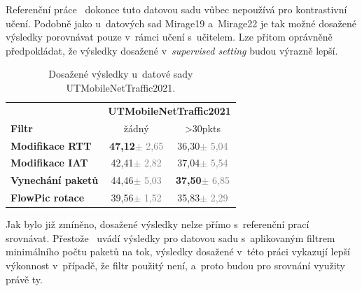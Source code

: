 Referenční práce~\cite{huawei_paper} dokonce tuto datovou sadu vůbec nepoužívá pro kontrastivní učení. Podobně jako u~datových sad Mirage19 a~Mirage22 je tak možné dosažené výsledky porovnávat pouze v~rámci učení s~učitelem. Lze přitom oprávněně předpokládat, že výsledky dosažené v~\textit{supervised setting} budou výrazně lepší.

\begin{table}[H]
    \centering
    \begin{tabular}{lcc}
        \toprule
          & \multicolumn{2}{c}{\textbf{UTMobileNetTraffic2021}} \\
          \cmidrule(lr){2-3}
         \textbf{Filtr} & žádný & >30pkts \\
        \midrule
        \textbf{Modifikace RTT} & \textbf{47,12}{\tiny\textcolor{gray}{$\pm$ 2,65}} & 36,30{\tiny\textcolor{gray}{$\pm$ 5,04}}\\
        \textbf{Modifikace IAT} & 42,41{\tiny\textcolor{gray}{$\pm$ 2,82}} & 37,04{\tiny\textcolor{gray}{$\pm$ 5,54}}\\
        \textbf{Vynechání paketů} & 44,46{\tiny\textcolor{gray}{$\pm$ 5,03}} & \textbf{37,50}{\tiny\textcolor{gray}{$\pm$ 6,85}}\\
        \textbf{FlowPic rotace} & 39,56{\tiny\textcolor{gray}{$\pm$ 1,52}} & 35,83{\tiny\textcolor{gray}{$\pm$ 2,29}}\\
        \bottomrule
    \end{tabular}
    \caption{Dosažené výsledky u~datové sady UTMobileNetTraffic2021.}
\end{table}

Jak bylo již zmíněno, dosažené výsledky nelze přímo s~referenční prací~\cite{huawei_paper} srovnávat. Přestože~\cite{huawei_paper} uvádí výsledky pro datovou sadu s~aplikovaným filtrem minimálního počtu paketů na tok, výsledky dosažené v~této práci vykazují lepší výkonnost v~případě, že filtr použitý není, a~proto budou pro srovnání využity právě ty. 

